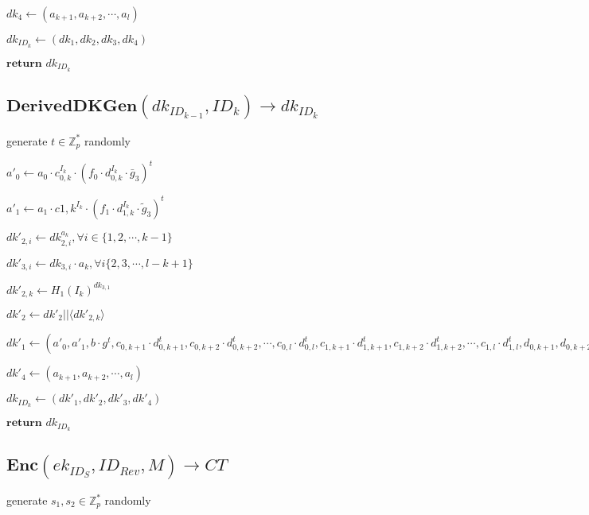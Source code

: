\documentclass[a4paper]{article}
\begin{document}
$\textit{dk}_4 \gets (a_{k + 1}, a_{k + 2}, \cdots, a_l)$

$\textit{dk}_{\textit{ID}_k} \gets (\textit{dk}_1, \textit{dk}_2, \textit{dk}_3, \textit{dk}_4)$

$\textbf{return }\textit{dk}_{\textit{ID}_k}$

\subsection{$\textbf{DerivedDKGen}(\textit{dk}_{\textit{ID}_{k - 1}}, \textit{ID}_k) \rightarrow \textit{dk}_{\textit{ID}_k}$}

generate $t \in \mathbb{Z}_p^*$ randomly

$a'_0 \gets a_0 \cdot c_{0, k}^{I_k} \cdot (f_0 \cdot d_{0, k}^{I_k} \cdot \bar{g}_3)^t$

$a'_1 \gets a_1 \cdot c{1, k}^{I_k} \cdot (f_1 \cdot d_{1, k}^{I_k} \cdot \tilde{g}_3)^t$

$\textit{dk}'_{2, i} \gets \textit{dk}_{2, i}^{a_k}, \forall i \in \{1, 2, \cdots, k - 1\}$

$\textit{dk}'_{3, i} \gets \textit{dk}_{3, i} \cdot a_k, \forall i \{2, 3, \cdots, l - k + 1\}$

$\textit{dk}'_{2, k} \gets H_1(I_k)^{\textit{dk}_{3, 1}}$

$\textit{dk}'_2 \gets \textit{dk}'_2 || \langle\textit{dk}'_{2, k}\rangle$

$\textit{dk}'_1 \gets (
a'_0, a'_1, b \cdot g^t,
c_{0, k + 1} \cdot d_{0, k + 1}^t, c_{0, k + 2} \cdot d_{0, k + 2}^t, \cdots, c_{0, l} \cdot d_{0, l}^t,
c_{1, k + 1} \cdot d_{1, k + 1}^t, c_{1, k + 2} \cdot d_{1, k + 2}^t, \cdots, c_{1, l} \cdot d_{1, l}^t,
d_{0, k + 1}, d_{0, k + 2}, \cdots, d_{0, l},
d_{1, k + 1}, d_{1, k + 2}, \cdots, d_{1, l},
f_0 \cdot c_{0, k}^{I_k}, f_1 \cdot c_{1, k}^{I_k}
)$

$\textit{dk}'_4 \gets (a_{k + 1}, a_{k + 2}, \cdots, a_l)$

$\textit{dk}_{\textit{ID}_k} \gets (\textit{dk}'_1, \textit{dk}'_2, \textit{dk}'_3, \textit{dk}'_4)$

$\textbf{return }\textit{dk}_{\textit{ID}_k}$

\subsection{$\textbf{Enc}(\textit{ek}_{\textit{ID}_S}, \textit{ID}_\textit{Rev}, M) \rightarrow \textit{CT}$}

generate $s_1, s_2 \in \mathbb{Z}_p^*$ randomly
\end{document}
